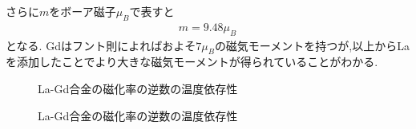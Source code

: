 さらに$m$をボーア磁子$\mu_B$で表すと
\begin{align}
  m=9.48\mu_B
\end{align}
となる\cite{alma990008542450204034}.
Gdはフント則によればおよそ$7\mu_B$の磁気モーメントを持つが,以上からLaを添加したことでより大きな磁気モーメントが得られていることがわかる\cite{alma990008542450204034}.
\begin{figure}[hptb]
  \begin{center}
    
    \caption{La-Gd合金の磁化率の逆数の温度依存性}
    \label{fig:cons_LaGd_T-chi}
  \end{center}
\end{figure}
\begin{figure}[hptb]
  \begin{center}
    
    \caption{La-Gd合金の磁化率の逆数の温度依存性}
    \label{fig:cons_LaGd_T-chi_fit}
  \end{center}
\end{figure}